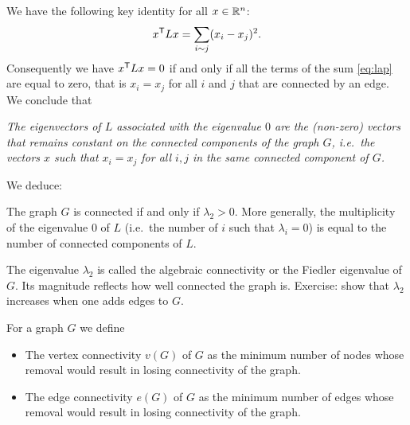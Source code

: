 \documentclass[11pt,nocut]{article}
\begin{document}
We have the following key identity for all $x \in \mathbb{R}^n$:
\begin{equation}\label{eq:lap}
x^{{\sf T}} L x = \sum_{i \sim j} (x_i - x_j)^2.
\end{equation}
Consequently we have $x^{{\sf T}} L x = 0$ if and only if all the terms of the sum \eqref{eq:lap} are equal to zero, that is $x_i = x_j$ for all $i$ and $j$ that are connected by an edge. We conclude that
\begin{center}
	\emph{
	The eigenvectors of $L$ associated with the eigenvalue $0$ are the (non-zero) vectors that remains constant on the connected components of the graph $G$, i.e.\ the vectors $x$ such that $x_i = x_j$ for all $i,j$ in the same connected component of $G$.}
\end{center}

We deduce:
\begin{proposition}\label{prop:lambda2}
	The graph $G$ is connected if and only if $\lambda_2 > 0$.
More generally, the multiplicity of the eigenvalue $0$ of $L$ (i.e.\ the number of $i$ such that $\lambda_i = 0$) is equal to the number of connected components of $L$.
\end{proposition}

The eigenvalue $\lambda_2$ is called the algebraic connectivity or the Fiedler eigenvalue of $G$. Its magnitude reflects how well connected the graph is.
Exercise: show that $\lambda_2$ increases when one adds edges to $G$.

\begin{definition}
	For a graph $G$ we define
	\begin{itemize}
		\item The vertex connectivity $v(G)$ of $G$ as the minimum number of nodes whose removal would result in losing connectivity of the graph.
		\item The edge connectivity $e(G)$ of $G$ as the minimum number of edges whose removal would result in losing connectivity of the graph.
	\end{itemize}
\end{definition}
\end{document}
